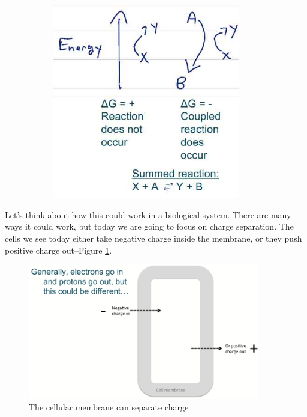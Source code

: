 \documentclass[]{article}
\begin{document}
\begin{figure}[H]
\begin{subfigure}[t]{0.3\textwidth}
		\includegraphics[width=0.9\textwidth]{CoupledReactions}
	\end{subfigure}
\end{figure}

 Let's think about how this could work in a biological system. There are many ways it could work, but today we are going to focus on charge separation. The cells we see today either take negative charge inside the membrane, or they push positive charge out--Figure \ref{fig:EnergyHarvesting1}.

\begin{figure}[H]
	\caption{The cellular membrane 	can separate charge} \label{fig:EnergyHarvesting1} 
	\includegraphics[width=0.9\textwidth]{EnergyHarvesting1}
\end{figure}
\end{document}
